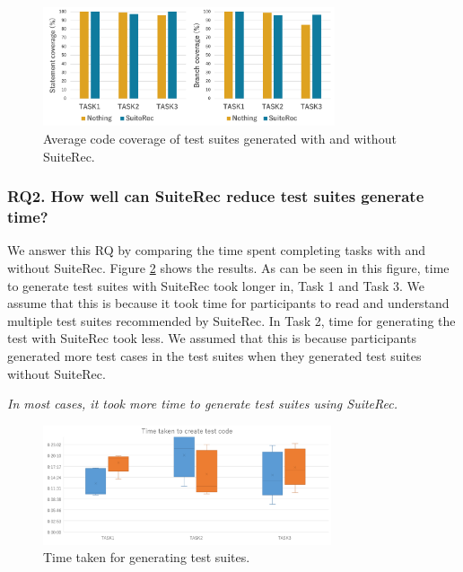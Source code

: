 \documentclass[conference]{IEEEtran}
\begin{document}
\begin{figure}[htbp]
\centerline{\includegraphics[width=8.6cm]{coverage.pdf}}
\caption{Average code coverage of test suites generated with and without \textsf{SuiteRec}.}
\label{fig5coverage}
\end{figure}


\subsubsection{RQ2. How well can SuiteRec reduce test suites generate time?}
We answer this RQ by comparing the time spent completing tasks with and without \textsf{SuiteRec}. Figure \ref{fig7:time} shows the results. As can be seen in this figure, time to generate test suites with \textsf{SuiteRec} took longer in, Task 1 and Task 3. We assume that this is because it took time for participants to read and understand multiple test suites recommended by \textsf{SuiteRec}. In Task 2, time for generating the test with \textsf{SuiteRec} took less. We assumed that this is because participants generated more test cases in the test suites when they generated test suites without \textsf{SuiteRec}.

\begin{breakbox}
\textit{In most cases, it took more time to generate test suites using \textsf{SuiteRec}.}
\end{breakbox}
\begin{figure}[htbp]
\centerline{\includegraphics[width=8.5cm]{time.pdf}}
\caption{Time taken for generating test suites.}
\label{fig7:time}
\end{figure}
\end{document}
